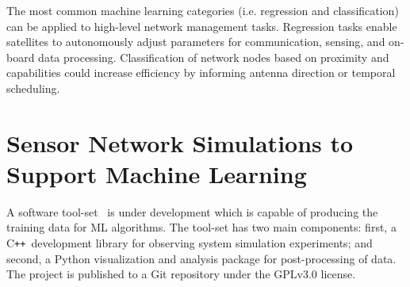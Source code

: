 \documentclass[conference]{IEEEtran}
\newcommand{\project}{{\sc{Collaborate}}~}
\newcommand{\cpp}{C\texttt{++}~}
\begin{document}
The most common machine learning categories (i.e. regression and classification) can be applied to high-level network management tasks.  Regression tasks enable satellites to autonomously adjust parameters for communication, sensing, and on-board data processing.  Classification of network nodes based on proximity and capabilities could increase efficiency by informing antenna direction or temporal scheduling.  %

\section{Sensor Network Simulations to Support Machine Learning}
\label{sec:software}




A software tool-set \project is under development which is capable of producing the training data for ML algorithms.  The tool-set has two main components: first, a \cpp development library for observing system simulation experiments; and second, a Python visualization and analysis package for post-processing of data.  The project is published to a Git repository under the GPLv3.0 license.
\end{document}
